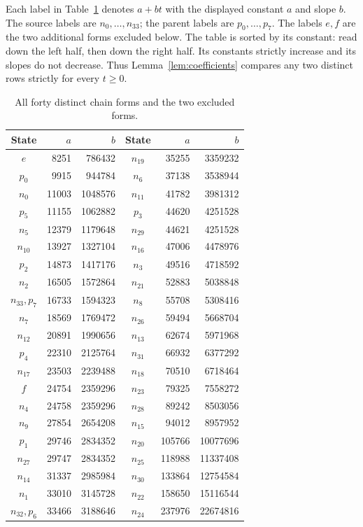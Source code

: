 \documentclass[11pt,letterpaper]{article}
\begin{document}
Each label in Table~\ref{tab:states} denotes \(a+bt\) with the displayed
constant \(a\) and slope \(b\). The source labels are \(n_0,\ldots,n_{33}\);
the parent labels are \(p_0,\ldots,p_7\).
The labels \(e,f\) are the two additional forms excluded below.
The table is sorted by its constant: read down the left half, then
down the right half. Its constants strictly increase and its slopes
do not decrease. Thus Lemma~\ref{lem:coefficients} compares any two
distinct rows strictly for every \(t\ge0\).

\begin{table}[ht]
\centering
\small
\begin{tabular}{crrcrr}
\toprule
State & \(a\) & \(b\) & State & \(a\) & \(b\)\\
\midrule
\(e\) & 8251 & 786432 & \(n_{19}\) & 35255 & 3359232 \\
\(p_{0}\) & 9915 & 944784 & \(n_{6}\) & 37138 & 3538944 \\
\(n_{0}\) & 11003 & 1048576 & \(n_{11}\) & 41782 & 3981312 \\
\(p_{5}\) & 11155 & 1062882 & \(p_{3}\) & 44620 & 4251528 \\
\(n_{5}\) & 12379 & 1179648 & \(n_{29}\) & 44621 & 4251528 \\
\(n_{10}\) & 13927 & 1327104 & \(n_{16}\) & 47006 & 4478976 \\
\(p_{2}\) & 14873 & 1417176 & \(n_{3}\) & 49516 & 4718592 \\
\(n_{2}\) & 16505 & 1572864 & \(n_{21}\) & 52883 & 5038848 \\
\(n_{33}, p_{7}\) & 16733 & 1594323 & \(n_{8}\) & 55708 & 5308416 \\
\(n_{7}\) & 18569 & 1769472 & \(n_{26}\) & 59494 & 5668704 \\
\(n_{12}\) & 20891 & 1990656 & \(n_{13}\) & 62674 & 5971968 \\
\(p_{4}\) & 22310 & 2125764 & \(n_{31}\) & 66932 & 6377292 \\
\(n_{17}\) & 23503 & 2239488 & \(n_{18}\) & 70510 & 6718464 \\
\(f\) & 24754 & 2359296 & \(n_{23}\) & 79325 & 7558272 \\
\(n_{4}\) & 24758 & 2359296 & \(n_{28}\) & 89242 & 8503056 \\
\(n_{9}\) & 27854 & 2654208 & \(n_{15}\) & 94012 & 8957952 \\
\(p_{1}\) & 29746 & 2834352 & \(n_{20}\) & 105766 & 10077696 \\
\(n_{27}\) & 29747 & 2834352 & \(n_{25}\) & 118988 & 11337408 \\
\(n_{14}\) & 31337 & 2985984 & \(n_{30}\) & 133864 & 12754584 \\
\(n_{1}\) & 33010 & 3145728 & \(n_{22}\) & 158650 & 15116544 \\
\(n_{32}, p_{6}\) & 33466 & 3188646 & \(n_{24}\) & 237976 & 22674816 \\
\bottomrule
\end{tabular}
\caption{All forty distinct chain forms and the two excluded forms.}
\label{tab:states}
\end{table}
\end{document}
